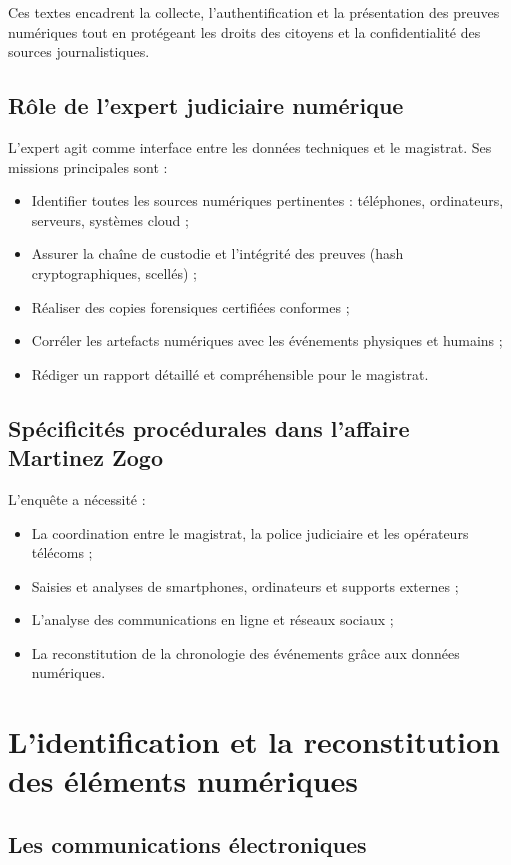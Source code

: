 \documentclass[12pt,a4paper]{report}
\begin{document}
Ces textes encadrent la collecte, l’authentification et la présentation des preuves numériques tout en protégeant les droits des citoyens et la confidentialité des sources journalistiques.

\section{Rôle de l’expert judiciaire numérique}

L’expert agit comme interface entre les données techniques et le magistrat. Ses missions principales sont : 
\begin{itemize}
    \item Identifier toutes les sources numériques pertinentes : téléphones, ordinateurs, serveurs, systèmes cloud ;
    \item Assurer la chaîne de custodie et l’intégrité des preuves (hash cryptographiques, scellés) ;
    \item Réaliser des copies forensiques certifiées conformes ;
    \item Corréler les artefacts numériques avec les événements physiques et humains ;
    \item Rédiger un rapport détaillé et compréhensible pour le magistrat.
\end{itemize}

\section{Spécificités procédurales dans l’affaire Martinez Zogo}

L’enquête a nécessité : 
\begin{itemize}
    \item La coordination entre le magistrat, la police judiciaire et les opérateurs télécoms ;
    \item Saisies et analyses de smartphones, ordinateurs et supports externes ;
    \item L'analyse des communications en ligne et réseaux sociaux ;
    \item La reconstitution de la chronologie des événements grâce aux données numériques.
\end{itemize}

\chapter{L'identification et la reconstitution des éléments numériques}

\section{Les communications électroniques}\
\end{document}
